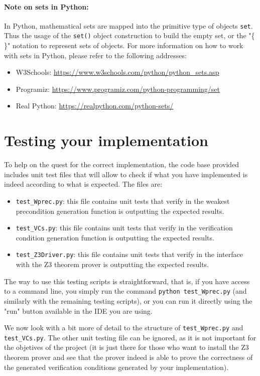 \documentclass[11pt]{article}
\begin{document}
\paragraph{Note on sets in Python:} In Python, mathematical sets are mapped into the primitive type of objects \lstinline!set!. Thus the usage of the \lstinline!set()! object construction to build the empty set, or the "\{ \}" notation to represent sets of objects. For more information on how to work with sets in Python, please refer to the following addresses:
\begin{itemize}
  \item W3Schools: \url{https://www.w3schools.com/python/python_sets.asp}
  \item Programiz: \url{https://www.programiz.com/python-programming/set}
  \item Real Python: \url{https://realpython.com/python-sets/}
\end{itemize}

\section{Testing your implementation}

To help on the quest for the correct implementation, the code base provided includes unit test files that will allow to check if what you have implemented is indeed according to what is expected. The files are:
\begin{itemize}
  \item \texttt{test\_Wprec.py}: this file contains unit tests that verify in the weakest precondition generation function is outputting the expected results.
  \item \texttt{test\_VCs.py}: this file contains unit tests that verify in the verification condition generation function is outputting the expected results.
  \item \texttt{test\_Z3Driver.py}: this file contains unit tests that verify in the interface with the Z3 theorem prover is outputting the expected results.
\end{itemize}

The way to use this testing scripts is straightforward, that is, if you have access to a command line, you simply run the command \lstinline!python test_Wprec.py! (and similarly with the remaining testing scripts), or you can run it directly using the "run" button available in the IDE you are using.

We now look with a bit more of detail to the structure of \texttt{test\_Wprec.py} and \texttt{test\_VCs.py}. The other unit testing file can be ignored, as it is not important for the objetives of the project (it is just there for those who want to install the Z3 theorem prover and see that the prover indeed is able to prove the correctness of the generated verification conditions generated by your implementation).
\end{document}
